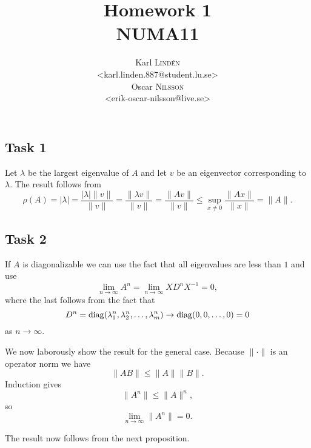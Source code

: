 \documentclass[a4paper,12pt]{article}
\begin{document}
\title{Homework 1 \\ NUMA11}
\author{
  Karl \textsc{Lind\'{e}n} \\
  <karl.linden.887@student.lu.se> \\
  Oscar \textsc{Nilsson} \\
  <erik-oscar-nilsson@live.se>
}

\maketitle
\thispagestyle{empty}

\newpage


\subsection*{Task 1}

Let \(\lambda\) be the largest eigenvalue of \(A\) and let \(v\) be an
eigenvector corresponding to \(\lambda\).
The result follows from
\[
  \rho(A)
    = |\lambda|
    = \frac{|\lambda|\|v\|}{\|v\|}
    = \frac{\|\lambda v\|}{\|v\|}
    = \frac{\|Av\|}{\|v\|}
    \le \sup_{x \ne 0} \frac{\|Ax\|}{\|x\|}
    = \|A\|.
\]


\subsection*{Task 2}

If \(A\) is diagonalizable we can use the fact that all eigenvalues are less
than \(1\) and use
\[ \lim_{n \to \infty} A^n = \lim_{n \to \infty} XD^nX^{-1} = 0, \]
where the last follows from the fact that
\[
  D^n
    = \mathrm{diag}(\lambda_1^n, \lambda_2^n, \dots, \lambda_m^n)
    \to \mathrm{diag}(0, 0, \dots, 0)
    = 0
\]
as \(n \to \infty\).

We now laborously show the result for the general case.
Because \(\|\cdot\|\) is an operator norm we have
\[ \|AB\| \le \|A\|\|B\|. \]
Induction gives
\[ \|A^n\| \le \|A\|^n, \]
so
\[ \lim_{n \to \infty} \|A^n\| = 0. \]

The result now follows from the next proposition.
\end{document}
